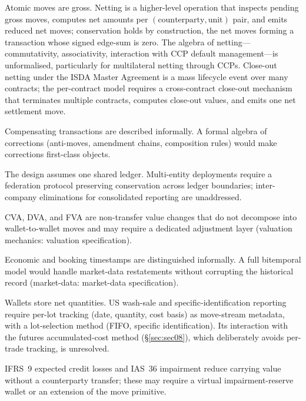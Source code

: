 \begin{description}[nosep]
\item[Netting and close-out.] Atomic moves are gross. Netting is a higher-level operation that inspects pending gross moves, computes net amounts per $(\text{counterparty},\text{unit})$ pair, and emits reduced net moves; conservation holds by construction, the net moves forming a transaction whose signed edge-sum is zero. The algebra of netting---commutativity, associativity, interaction with CCP default management---is unformalised, particularly for multilateral netting through CCPs. Close-out netting under the ISDA Master Agreement is a mass lifecycle event over many contracts; the per-contract model requires a cross-contract close-out mechanism that terminates multiple contracts, computes close-out values, and emits one net settlement move.
\item[Correction algebra.] Compensating transactions are described informally. A formal algebra of corrections (anti-moves, amendment chains, composition rules) would make corrections first-class objects.
\item[Multi-entity federation.] The design assumes one shared ledger. Multi-entity deployments require a federation protocol preserving conservation across ledger boundaries; inter-company eliminations for consolidated reporting are unaddressed.
\item[XVA.] CVA, DVA, and FVA are non-transfer value changes that do not decompose into wallet-to-wallet moves and may require a dedicated adjustment layer (valuation mechanics: valuation specification).
\item[Bitemporal semantics.] Economic and booking timestamps are distinguished informally. A full bitemporal model would handle market-data restatements without corrupting the historical record (market-data: market-data specification).
\item[Tax-lot tracking.] Wallets store net quantities. US wash-sale and specific-identification reporting require per-lot tracking (date, quantity, cost basis) as move-stream metadata, with a lot-selection method (FIFO, specific identification). Its interaction with the futures accumulated-cost method (\S\ref{sec:sec08}), which deliberately avoids per-trade tracking, is unresolved.
\item[Impairment and ECL.] IFRS~9 expected credit losses and IAS~36 impairment reduce carrying value without a counterparty transfer; these may require a virtual impairment-reserve wallet or an extension of the move primitive.

\end{description}
